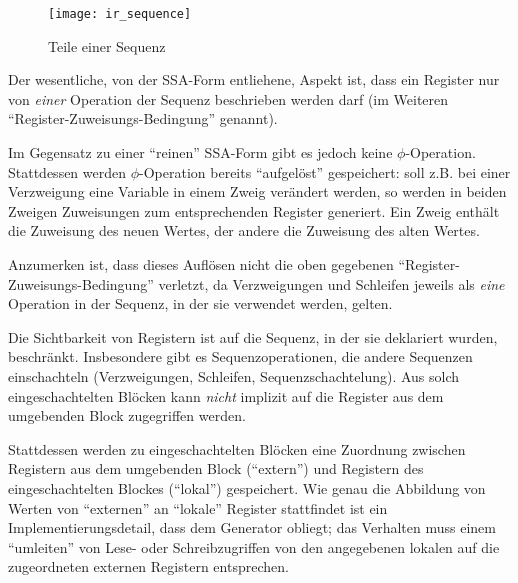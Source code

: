 \documentclass[twoside,a4paper,fleqn,12pt]{book}
\begin{document}
\begin{figure}[h]
   \centering
  \texttt{[image: ir\_sequence]}
  \caption{Teile einer Sequenz}
  \label{fig:ir_sequence}
\end{figure}

Der wesentliche, von der SSA-Form entliehene, Aspekt ist, dass ein Register nur von \emph{einer} Operation der Sequenz beschrieben werden darf
(im Weiteren "`Register-Zuweisungs-Bedingung"' genannt).

Im Gegensatz zu einer "`reinen"' SSA-Form gibt es jedoch keine $\phi$-Operation. Stattdessen werden $\phi$-Operation bereits "`aufgelöst"'
gespeichert: soll z.B. bei einer Verzweigung eine Variable in einem Zweig verändert werden, so werden in beiden Zweigen Zuweisungen zum
entsprechenden Register generiert. Ein Zweig enthält die Zuweisung des neuen Wertes, der andere die Zuweisung des alten Wertes.

Anzumerken ist, dass dieses Auflösen nicht die oben gegebenen "`Register-Zuweisungs-Bedingung"' verletzt, da Verzweigungen und Schleifen
jeweils als \emph{eine} Operation in der Sequenz, in der sie verwendet werden, gelten.

Die Sichtbarkeit von Registern ist auf die Sequenz, in der sie deklariert wurden, beschränkt.
Insbesondere gibt es Sequenzoperationen, die andere Sequenzen einschachteln (Verzweigungen, Schleifen, Sequenzschachtelung).
Aus solch eingeschachtelten Blöcken kann \emph{nicht} implizit auf die Register aus dem umgebenden Block
zugegriffen werden.

Stattdessen werden zu eingeschachtelten Blöcken eine Zuordnung zwischen Registern aus dem umgebenden Block
("`extern"') und
Registern des eingeschachtelten Blockes ("`lokal"') gespeichert.
Wie genau die Abbildung von Werten von "`externen"' an "`lokale"' Register stattfindet ist ein Implementierungsdetail, dass dem Generator obliegt;
das Verhalten muss einem "`umleiten"' von Lese- oder Schreibzugriffen von den angegebenen lokalen auf die zugeordneten externen
Registern entsprechen.
\end{document}
